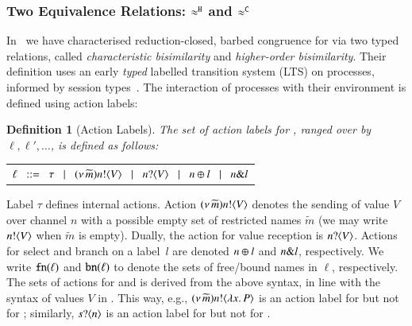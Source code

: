 \documentclass[preprint,11pt]{elsarticle}
\newtheorem{definition}{Definition}[section]
\begin{document}
{
\subsubsection{Two Equivalence Relations: $\approx^\mathtt{H}$ and $\approx^\mathtt{C}$}\label{ss:equiv}
In~\cite{characteristic_bis,KouzapasPY17} we have characterised
reduction-closed, barbed congruence for \HOp
via two typed relations, called
{\em characteristic bisimilarity}
and 
\emph{higher-order bisimilarity}.
Their definition 
uses an early \emph{typed}
labelled transition system (LTS) on processes, informed by session
types~\cite{KY2015}. 
The interaction of processes with their environment is defined using action labels:
%
\begin{definition}[Action Labels]\label{d:labels}
The set of action labels for \HOp, ranged over by $\ell, \ell', \ldots$, is defined as follows:
\begin{center}
	\begin{tabular}{l}
		$\ell
			\;\;::=\;\;  \tau 
			\;\;\;|\;\;\;	(\nu\, \widetilde{m}) n ! \langle V \rangle
			\;\;\;|\;\;\;	n ? \langle V \rangle 
			\;\;\;|\;\;\;	n \oplus l 
			\;\;\;|\;\;\;	n \& l$
	\end{tabular}
\end{center}
\end{definition}
%
\noi 
Label $\tau$ defines internal actions.
Action
$(\nu\, \widetilde{m}) n ! \langle V \rangle$
denotes the sending of value $V$
over channel $n$ with a possible empty set of restricted names
$\widetilde{m}$ 
(we may write $n ! \langle V \rangle$ when $\widetilde{m}$ is empty).
Dually, the action for value reception is 
$n ? \langle V \rangle$.
Actions for select and branch on
a label~$l$ are denoted $n \oplus l$ and $n \& l$, respectively.
We write $\mathtt{fn}(\ell)$ and $\mathtt{bn}(\ell)$ to denote the
sets of free/bound names in $\ell$, respectively.
The sets of actions for \HO and \sessp is derived from the above syntax, in line with the syntax of values $V$ in .
This way, e.g., $(\nu\, \widetilde{m}) n ! \langle \lambda x.\,P \rangle$ is an action label for \HO but not for \sessp;
similarly, $s ? \langle n \rangle$ is an action label for \sessp but not for \HO.


}
\end{document}
